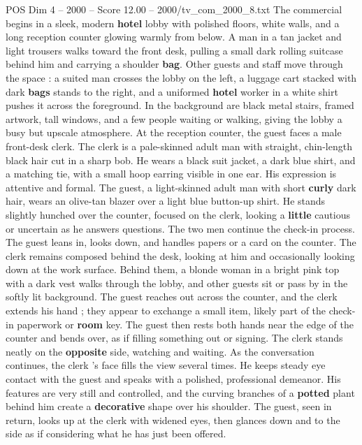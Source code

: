 \begin{textsample}{POS Dim 4 – 2000 – Score 12.00 – 2000/tv\_com\_2000\_8.txt}  \label{ex:f4_pos_059}
The commercial begins in a sleek, modern \textbf{hotel} lobby with polished floors, white walls, and a long reception counter glowing warmly from below.
A man in a tan jacket and light trousers walks toward the front desk, pulling a small dark rolling suitcase behind him and carrying a shoulder \textbf{bag}.
Other guests and staff move through the space : a suited man crosses the lobby on the left, a luggage cart stacked with dark \textbf{bags} stands to the right, and a uniformed \textbf{hotel} worker in a white shirt pushes it across the foreground.
In the background are black metal stairs, framed artwork, tall windows, and a few people waiting or walking, giving the lobby a busy but upscale atmosphere.
At the reception counter, the guest faces a male front-desk clerk.
The clerk is a pale-skinned adult man with straight, chin-length black hair cut in a sharp bob.
He wears a black suit jacket, a dark blue shirt, and a matching tie, with a small hoop earring visible in one ear.
His expression is attentive and formal.
The guest, a light-skinned adult man with short \textbf{curly} dark hair, wears an olive-tan blazer over a light blue button-up shirt.
He stands slightly hunched over the counter, focused on the clerk, looking a \textbf{little} cautious or uncertain as he answers questions.
The two men continue the check-in process.
The guest leans in, looks down, and handles papers or a card on the counter.
The clerk remains composed behind the desk, looking at him and occasionally looking down at the work surface.
Behind them, a blonde woman in a bright pink top with a dark vest walks through the lobby, and other guests sit or pass by in the softly lit background.
The guest reaches out across the counter, and the clerk extends his hand ; they appear to exchange a small item, likely part of the check-in paperwork or \textbf{room} key.
The guest then rests both hands near the edge of the counter and bends over, as if filling something out or signing.
The clerk stands neatly on the \textbf{opposite} side, watching and waiting.
As the conversation continues, the clerk ’s face fills the view several times.
He keeps steady eye contact with the guest and speaks with a polished, professional demeanor.
His features are very still and controlled, and the curving branches of a \textbf{potted} plant behind him create a \textbf{decorative} shape over his shoulder.
The guest, seen in return, looks up at the clerk with widened eyes, then glances down and to the side as if considering what he has just been offered.

\end{textsample}
